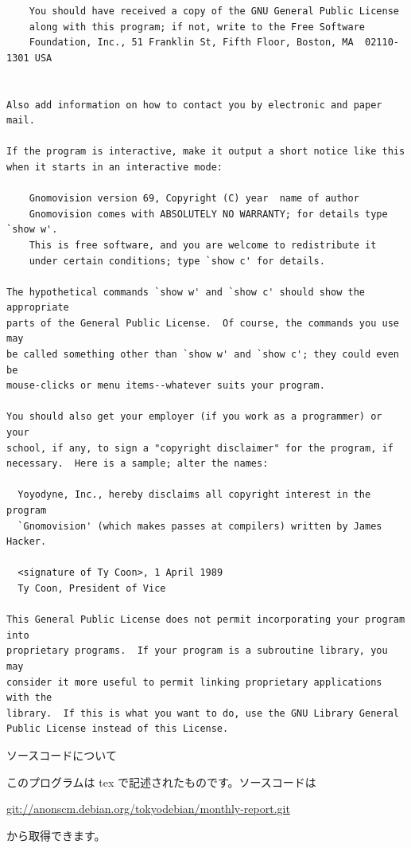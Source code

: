 \documentclass[mingoth,a4paper]{jsarticle}
\begin{document}
\begin{multicols}{2}
\begin{fontsize}{6}{6}
\begin{verbatim}
    You should have received a copy of the GNU General Public License
    along with this program; if not, write to the Free Software
    Foundation, Inc., 51 Franklin St, Fifth Floor, Boston, MA  02110-1301 USA


Also add information on how to contact you by electronic and paper mail.

If the program is interactive, make it output a short notice like this
when it starts in an interactive mode:

    Gnomovision version 69, Copyright (C) year  name of author
    Gnomovision comes with ABSOLUTELY NO WARRANTY; for details type `show w'.
    This is free software, and you are welcome to redistribute it
    under certain conditions; type `show c' for details.

The hypothetical commands `show w' and `show c' should show the appropriate
parts of the General Public License.  Of course, the commands you use may
be called something other than `show w' and `show c'; they could even be
mouse-clicks or menu items--whatever suits your program.

You should also get your employer (if you work as a programmer) or your
school, if any, to sign a "copyright disclaimer" for the program, if
necessary.  Here is a sample; alter the names:

  Yoyodyne, Inc., hereby disclaims all copyright interest in the program
  `Gnomovision' (which makes passes at compilers) written by James Hacker.

  <signature of Ty Coon>, 1 April 1989
  Ty Coon, President of Vice

This General Public License does not permit incorporating your program into
proprietary programs.  If your program is a subroutine library, you may
consider it more useful to permit linking proprietary applications with the
library.  If this is what you want to do, use the GNU Library General
Public License instead of this License.
 \end{verbatim}
 \end{fontsize}
\end{multicols}

\begin{center}
ソースコードについて
\end{center}

このプログラムは tex で記述されたものです。ソースコードは
\begin{center}
  \url{git://anonscm.debian.org/tokyodebian/monthly-report.git}
\end{center}
から取得できます。
\end{document}

